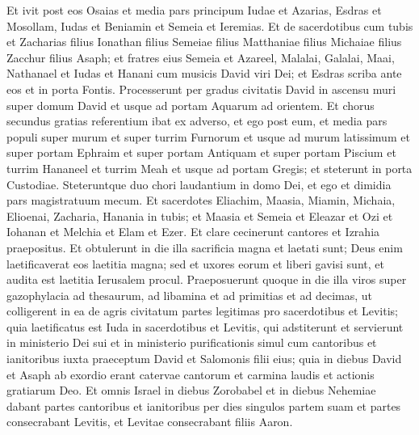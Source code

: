 \begin{biblechapter}
\verse Et ivit post eos Osaias et media pars principum Iudae  
\verse et Azarias, Esdras et Mosollam, 
\verse Iudas et Beniamin et Semeia et Ieremias. 
\verse Et de sacerdotibus cum tubis et Zacharias filius Ionathan filius Semeiae filius Matthaniae filius Michaiae filius Zacchur filius Asaph;  
\verse et fratres eius Semeia et Azareel, Malalai, Galalai, Maai, Nathanael et Iudas et Hanani cum musicis David viri Dei; et Esdras scriba ante eos et in porta Fontis. 
\verse Processerunt per gradus civitatis David in ascensu muri super domum David et usque ad portam Aquarum ad orientem. 
\verse Et chorus secundus gratias referentium ibat ex adverso, et ego post eum, et media pars populi super murum et super turrim Furnorum et usque ad murum latissimum 
\verse et super portam Ephraim et super portam Antiquam et super portam Piscium et turrim Hananeel et turrim Meah et usque ad portam Gregis; et steterunt in porta Custodiae. 
\verse Steteruntque duo chori laudantium in domo Dei, et ego et dimidia pars magistratuum mecum. 
\verse Et sacerdotes Eliachim, Maasia, Miamin, Michaia, Elioenai, Zacharia, Hanania in tubis; 
\verse et Maasia et Semeia et Eleazar et Ozi et Iohanan et Melchia et Elam et Ezer. Et clare cecinerunt cantores et Izrahia praepositus. 
\verse Et obtulerunt in die illa sacrificia magna et laetati sunt; Deus enim laetificaverat eos laetitia magna; sed et uxores eorum et liberi gavisi sunt, et audita est laetitia Ierusalem procul. 
\verse Praeposuerunt quoque in die illa viros super gazophylacia ad thesaurum, ad libamina et ad primitias et ad decimas, ut colligerent in ea de agris civitatum partes legitimas pro sacerdotibus et Levitis; quia laetificatus est Iuda in sacerdotibus et Levitis, qui adstiterunt 
\verse et servierunt in ministerio Dei sui et in ministerio purificationis simul cum cantoribus et ianitoribus iuxta praeceptum David et Salomonis filii eius; 
\verse quia in diebus David et Asaph ab exordio erant catervae cantorum et carmina laudis et actionis gratiarum Deo.  
\verse Et omnis Israel in diebus Zorobabel et in diebus Nehemiae dabant partes cantoribus et ianitoribus per dies singulos partem suam et partes consecrabant Levitis, et Levitae consecrabant filiis Aaron. 
\end{biblechapter}

